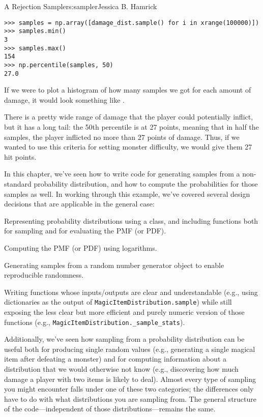 \begin{aosachapter}{A Rejection Sampler}{s:sampler}{Jessica B. Hamrick}
\begin{verbatim}
>>> samples = np.array([damage_dist.sample() for i in xrange(100000)])
>>> samples.min()
3
>>> samples.max()
154
>>> np.percentile(samples, 50)
27.0
\end{verbatim}

If we were to plot a histogram of how many samples we got for each
amount of damage, it would look something like
.


There is a pretty wide range of damage that the player could potentially
inflict, but it has a long tail: the 50th percentile is at 27 points,
meaning that in half the samples, the player inflicted no more than 27
points of damage. Thus, if we wanted to use this criteria for setting
monster difficulty, we would give them 27 hit points.

\label{summary}

In this chapter, we've seen how to write code for generating samples
from a non-standard probability distribution, and how to compute the
probabilities for those samples as well. In working through this
example, we've covered several design decisions that are applicable in
the general case:

\begin{aosaenumerate}
\def\labelenumi{\arabic{enumi}.}

\item
  Representing probability distributions using a class, and including
  functions both for sampling and for evaluating the PMF (or PDF).
\item
  Computing the PMF (or PDF) using logarithms.
\item
  Generating samples from a random number generator object to enable
  reproducible randomness.
\item
  Writing functions whose inputs/outputs are clear and understandable
  (e.g., using dictionaries as the output of
  \texttt{MagicItemDistribution.sample}) while still exposing the less
  clear but more efficient and purely numeric version of those functions
  (e.g., \texttt{MagicItemDistribution.\_sample\_stats}).
\end{aosaenumerate}

Additionally, we've seen how sampling from a probability distribution
can be useful both for producing single random values (e.g., generating
a single magical item after defeating a monster) and for computing
information about a distribution that we would otherwise not know (e.g.,
discovering how much damage a player with two items is likely to deal).
Almost every type of sampling you might encounter falls under one of
these two categories; the differences only have to do with what
distributions you are sampling from. The general structure of the
code---independent of those distributions---remains the same.

\end{aosachapter}
